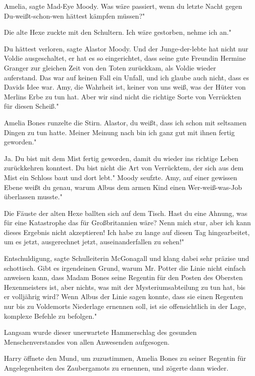 \glqq Amelia\grqq{}, sagte Mad-Eye Moody. \glqq Was wäre passiert, wenn du
letzte Nacht gegen Du-weißt-schon-wen hättest kämpfen müssen?"

Die alte Hexe zuckte mit den Schultern. \glqq Ich wäre gestorben, nehme ich an."

\glqq Du hättest verloren\grqq{}, sagte Alastor Moody. \glqq Und der
Junge-der-lebte hat nicht nur Voldie ausgeschaltet, er hat es so eingerichtet,
dass seine gute Freundin Hermine Granger zur gleichen Zeit von den Toten
zurückkam, als Voldie wieder auferstand. Das war auf keinen Fall ein Unfall, und
ich glaube auch nicht, dass es Davids Idee war. Amy, die Wahrheit ist, keiner
von uns weiß, was der Hüter von Merlins Erbe zu tun hat. Aber wir sind nicht die
richtige Sorte von Verrückten für diesen Scheiß."

Amelia Bones runzelte die Stirn. \glqq Alastor, du weißt, dass ich schon mit
seltsamen Dingen zu tun hatte. Meiner Meinung nach bin ich ganz gut mit ihnen
fertig geworden."

\glqq Ja. Du bist mit dem Mist fertig geworden, damit du wieder ins richtige
Leben zurückkehren konntest. Du bist nicht die Art von Verrücktem, der sich aus
dem Mist ein Schloss baut und dort lebt." Moody seufzte. \glqq Amy, auf einer
gewissen Ebene weißt du genau, warum Albus dem armen Kind einen Wer-weiß-was-Job
überlassen musste."

Die Fäuste der alten Hexe ballten sich auf dem Tisch. \glqq Hast du eine Ahnung,
was für eine Katastrophe das für Großbritannien wäre? Nenn mich stur, aber ich
kann dieses Ergebnis nicht akzeptieren! Ich habe zu lange auf diesen Tag
hingearbeitet, um es jetzt, ausgerechnet jetzt, auseinanderfallen zu sehen!"

\glqq Entschuldigung\grqq{}, sagte Schulleiterin McGonagall und klang dabei sehr
präzise und schottisch. \glqq Gibt es irgendeinen Grund, warum Mr. Potter die
Linie nicht einfach anweisen kann, dass Madam Bones seine Regentin für den
Posten des Obersten Hexenmeisters ist, aber nichts, was mit der
Mysteriumsabteilung zu tun hat, bis er volljährig wird? Wenn Albus der Linie
sagen konnte, dass sie einen Regenten nur bis zu Voldemorts Niederlage ernennen
soll, ist sie offensichtlich in der Lage, komplexe Befehle zu befolgen."

Langsam wurde dieser unerwartete Hammerschlag des gesunden Menschenverstandes
von allen Anwesenden aufgesogen.

Harry öffnete den Mund, um zuzustimmen, Amelia Bones zu seiner Regentin für
Angelegenheiten des Zaubergamots zu ernennen, und zögerte dann wieder.

